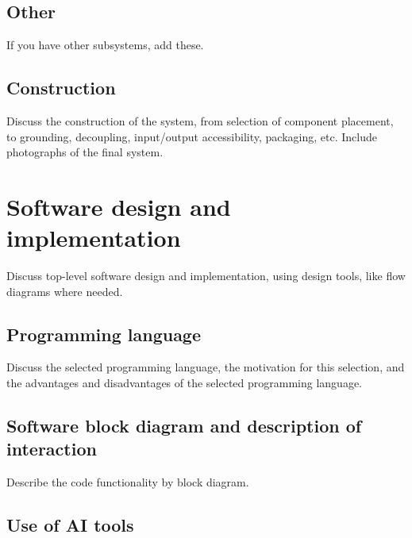 \documentclass[11pt,a4paper]{article}
\begin{document}
\subsection{Other}

If you have other subsystems, add these.

\subsection{Construction}

Discuss the construction of the system, from selection of component placement, to grounding, decoupling, input/output accessibility, packaging, etc. Include photographs of the final system.



\newpage
\section{Software design and implementation}

Discuss top-level software design and implementation, using design tools, like flow diagrams where needed. 

\subsection{Programming language}

Discuss the selected programming language, the motivation for this selection, and the advantages and disadvantages of the selected programming language.

\subsection{Software block diagram and description of interaction}

Describe the code functionality by block diagram.

\subsection{Use of AI tools}
\end{document}
